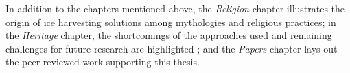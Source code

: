 In addition to the chapters mentioned above, the \textit{Religion} chapter illustrates the origin of ice
harvesting solutions among mythologies and religious practices; in the \textit{Heritage} chapter, the
shortcomings of the approaches used and remaining challenges for future research are highlighted ; and the
\textit{Papers} chapter lays out the peer-reviewed work supporting this thesis.


